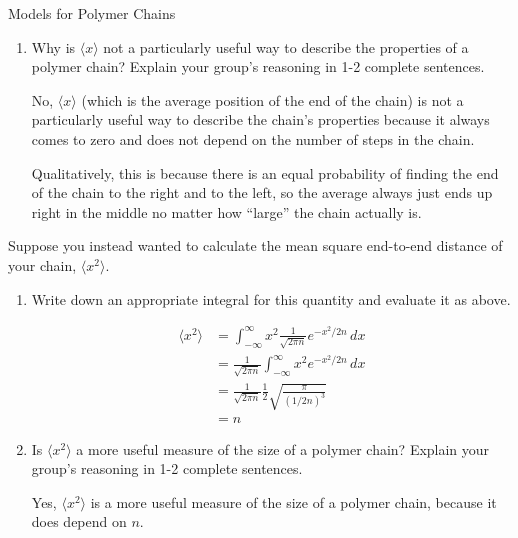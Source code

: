 \begin{activity}{Models for Polymer Chains}
\begin{ctqs}
\begin{enumerate}
			\item Why is $\langle x \rangle$ not a particularly useful way to describe the properties of a polymer chain?  Explain your group's reasoning in 1-2 complete sentences.
				
				\begin{solution}[1.5in]
					No, $\langle x \rangle$ (which is the average position of the end of the chain) is not a particularly useful way to describe the chain's properties because it always comes to zero and does not depend on the number of steps in the chain.  
					
					Qualitatively, this is because there is an equal probability of finding the end of the chain to the right and to the left, so the average always just ends up right in the middle no matter how ``large'' the chain actually is.
				\end{solution}
			
		\end{enumerate}
		
	\question Suppose you instead wanted to calculate the mean square end-to-end distance of your chain, $\langle x^2\rangle$.
	
		\begin{enumerate}
			\item Write down an appropriate integral for this quantity and evaluate it as above.
				
				\begin{solution}[1.5in]
					\begin{align*}
						\langle x^2 \rangle &= \int_{-\infty}^\infty x^2 \frac{1}{\sqrt{2\pi n}}e^{-x^2/2n}\, dx\\
						&= \frac{1}{\sqrt{2\pi n}} \int_{-\infty}^\infty x^2 e^{-x^2/2n}\, dx\\
						&= \frac{1}{\sqrt{2\pi n}} \frac{1}{2}\sqrt{\frac{\pi}{(1/2n)^3}}\\
						&= n
					\end{align*}
				\end{solution}
			
			\item Is $\langle x^2 \rangle$ a more useful measure of the size of a polymer chain?  Explain your group's reasoning in 1-2 complete sentences.
				
				\begin{solution}[1.5in]
				
					Yes, $\langle x^2 \rangle$ is a more useful measure of the size of a polymer chain, because it does depend on $n$.
					

\end{solution}
\end{enumerate}
\end{ctqs}
\end{activity}
